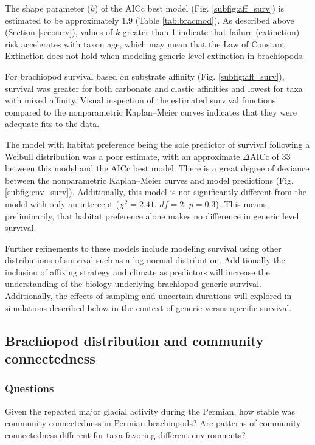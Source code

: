 \documentclass[12pt,letterpaper]{article}
\begin{document}
The shape parameter (\(k\)) of the AICc best model (Fig. \ref{subfig:aff_surv}) is estimated to be approximately 1.9 (Table \ref{tab:bracmod}). As described above (Section \ref{sec:surv}), values of \(k\) greater than 1 indicate that failure (extinction) risk accelerates with taxon age, which may mean that the Law of Constant Extinction does not hold when modeling generic level extinction in brachiopods.

For brachiopod survival based on substrate affinity (Fig. \ref{subfig:aff_surv}), survival was greater for both carbonate and clastic affinities and lowest for taxa with mixed affinity. Visual inspection of the estimated survival functions compared to the nonparametric Kaplan--Meier curves indicates that they were adequate fits to the data. 

The model with habitat preference being the sole predictor of survival following a Weibull distribution was a poor estimate, with an approximate \(\Delta\)AICc of 33 between this model and the AICc best model. There is a great degree of deviance between the nonparametric Kaplan--Meier curves and model predictions (Fig. \ref{subfig:env_surv}). Additionally, this model is not significantly different from the model with only an intercept (\(\chi^{2} = 2.41\), \(df = 2\), \(p = 0.3\)). This means, preliminarily, that habitat preference alone makes no difference in generic level survival.

Further refinements to these models include modeling survival using other distributions of survival such as a log-normal distribution. Additionally the inclusion of affixing strategy and climate as predictors will increase the understanding of the biology underlying brachiopod generic survival. Additionally, the effects of sampling and uncertain durations will explored in simulations described below in the context of generic versus specific survival.

\subsection{Brachiopod distribution and community connectedness} \label{sec:braccom}
\subsubsection{Questions} \label{sec:braccomques}
Given the repeated major glacial activity during the Permian, how stable was community connectedness in Permian brachiopods? Are patterns of community connectedness different for taxa favoring different environments?
\end{document}
